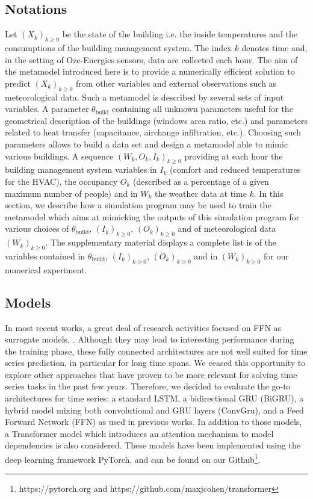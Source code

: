 \documentclass[12pt]{article}
\begin{document}
\subsection{Notations}
Let $(X_k)_{k\geqslant 0}$ be the state of the building i.e. the inside temperatures and the consumptions of the building management system. The index $k$ denotes time and, in the setting of Oze-Energies sensors, data are collected each hour. The aim of the metamodel introduced here is to provide a numerically efficient solution to predict $(X_k)_{k\geqslant 0}$ from other variables and external observations such as meteorological data. Such a metamodel is described by several sets of input variables. A parameter $\theta_{\mathrm{build}}$ containing all unknown parameters useful for the geometrical description of the buildings (windows area ratio, etc.) and parameters related to heat transfer  (capacitance, airchange infiltration, etc.). Choosing such parameters allows to build a data set and design a metamodel able to mimic various buildings.%
A sequence $(W_k,O_k,I_k)_{k\geqslant 0}$ providing at each hour the building management system variables in $I_k$ (comfort and reduced temperatures for the HVAC), the occupancy $O_k$ (described as a percentage of a given maximum number of people) and in $W_k$ the weather data at time $k$. In this section, we describe how a simulation program may be used to train the metamodel which aims at mimicking the outputs of this simulation program for  various choices of $\theta_{\mathrm{build}}$, $(I_k)_{k\geqslant 0}$, $(O_k)_{k\geqslant 0}$ and of meteorological data $(W_k)_{k\geqslant 0}$. The supplementary material displays a complete list is of the variables contained in $\theta_{\mathrm{build}}$, $(I_k)_{k\geqslant 0}$, $(O_k)_{k\geqslant 0}$ and in $(W_k)_{k\geqslant 0}$ for our numerical experiment.

\subsection{Models}
In most recent works, a great deal of research activities focused on FFN as surrogate models, \cite{Bre2020AnEM, Magnier2010MultiobjectiveOO, Reynolds2018AZB}. Although they may lead to interesting performance during the training phase, these fully connected architectures are not well suited for time series prediction, in particular for long time spans. We ceased this opportunity to explore other approaches that have proven to be more relevant for solving time series tasks in the past few years. Therefore, we decided to evaluate the go-to architectures for time series: a standard LSTM, a bidirectional GRU (BiGRU), a hybrid model mixing both convolutional and GRU layers (ConvGru), and a Feed Forward Network (FFN) as used in previous works.  In addition to those models, a Transformer model which  introduces an attention mechanism to model dependencies is also considered. These models have been implemented using the deep learning framework PyTorch, and can be found on our Github\footnote{https://pytorch.org and https://github.com/maxjcohen/transformer}.
\end{document}
